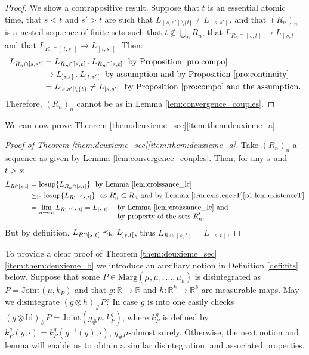 \documentclass[10pt,a4paper]{article}
\newcommand{\ldot}{\mathbin{.}}
\theoremstyle{plain}
\theoremstyle{definition}
\newcommand{\id}{\mathrm{Id}}
\newcommand{\join}{\mathrm{Joint}}
\newcommand{\ma}{\mathrm{Marg}}
\newcommand{\R}{\mathbb{R}}
\newcommand{\lcsup}{\operatorname{losup}}
\newcommand{\op}{\mathopen}
\newcommand{\clo}{\mathclose}
\newcommand{\leqlc}{\preceq_{\rm lo}}
\newcommand{\geqlc}{\succeq_{\rm lo}}
\begin{document}
\begin{proof}We show a contrapositive result. Suppose that $t$ is an essential atomic time, that $s<t$ and $s'>t$ are such that $L_{\op]s,s'\clo[\setminus\{t\}}\neq L_{\op]s,s'\clo[}$, and that $(R_n)_n$ is a nested sequence of finite sets such that $t\not\in\bigcup_nR_n$, that $L_{R_n\cap\op]s,t\clo[}\to L_{\op]s,t\clo[}$ and that $L_{R_n\cap\op]t,s'\clo[}\to L_{\op]t,s'\clo[}$. Then:
\begin{align*}
L_{R_n\cap\op]s,s'\clo[}&=L_{R_n\cap\op]s,t\clo[}{}\ldot L_{R_n\cap\op]s,t\clo[}\ \ \text{by Proposition \ref{pro:compo}}\\
&\to L_{\op]s,t\clo[}{}\ldot L_{\op]t,s'\clo[}\ \ \text{by assumption and by Proposition \ref{pro:continuity}}\\
&=L_{\op]s,s'\clo[\setminus\{t\}}\neq L_{\op]s,s'\clo[}\ \ \text{by Proposition \ref{pro:compo} and the assumption}.
\end{align*}
Therefore, $(R_n)_n$ cannot be as in Lemma \ref{lem:convergence_couples}.
\end{proof}

We can now prove Theorem \ref{them:deuxieme_sec}\eqref{item:them:deuxieme_a}.

\begin{proof}[Proof of Theorem \ref{them:deuxieme_sec}\eqref{item:them:deuxieme_a}]\label{proof:themBa} Take $(R_n)_n$ a sequence as given by Lemma \ref{lem:convergence_couples}. Then, for any $s$ and $t>s$:
\begin{align*}
L_{R\cap\op]s,t\clo[}&=\lcsup\{L_{R_n\cap\op]s,t\clo[}\}\ \ \text{by Lemma \ref{lem:croissance_lc}}\\
&\geqlc\lcsup\{L_{R'_n\cap\op]s,t\clo[}\}\ \ \text{as $R'_n\subset R_n$ and by Lemma \ref{lem:existenceT}\eqref{p1:lem:existenceT}}\\
&=\lim_{n\to\infty}L_{R'_n\cap\op]s,t\clo[}=L_{\op]s,t\clo[}\ \ \text{\begin{tabular}[t]{l}by Lemma \ref{lem:croissance_lc} and\\ by property of the sets $R'_n$.\end{tabular}}
\end{align*}
But by definition, $L_{R\cap\op]s,t\clo[}\leqlc L_{\op]s,t\clo[}$, thus $L_{R\cap\op]s,t\clo[}= L_{\op]s,t\clo[}$.
\end{proof}

To provide a clear proof of Theorem \ref{them:deuxieme_sec}\eqref{item:them:deuxieme_b} we introduce an auxiliary notion in Definition \ref{defi:fits} below.
Suppose that some $P\in \ma(\mu,\mu_1,\ldots,\mu_k)$ is disintegrated as $P=\join(\mu,k_{P})$ and that $g:\R\to \R$ and $h:\R^k\to \R^k$ are measurable maps. May we disintegrate $(g\otimes h)_\#P$? In case $g$ is into one easily checks $(g\otimes \id)_\#P=\join(g_\#\mu,k^g_P)$, where $k^g_P$ is defined by $k^g_P(y,\cdot)= k^g_P(g^{-1}(y),\cdot)$, $g_\#\mu$-almost surely. Otherwise, the next notion and lemma will enable us to obtain a similar disintegration, and associated properties.
\end{document}
